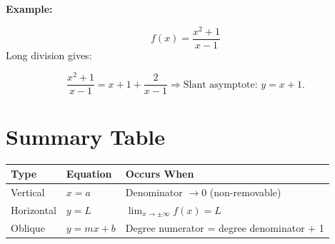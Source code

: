 \textbf{Example:}

\[
    f(x) = \frac{x^2 + 1}{x - 1}
\]
Long division gives:

\[
    \frac{x^2 + 1}{x - 1} = x + 1 + \frac{2}{x - 1}
    \Rightarrow \text{Slant asymptote: } y = x + 1.
\]

\section{Summary Table}

\begin{center}
    \begin{tabular}{|l|l|l|}
    \hline
    \textbf{Type} & \textbf{Equation} & \textbf{Occurs When} \\
    \hline
    Vertical      & \(x = a\)           & Denominator \(\to 0\) (non-removable) \\
    Horizontal    & \(y = L\)           & \(\lim_{x \to \pm \infty} f(x) = L\) \\
    Oblique       & \(y = mx + b\)      & Degree numerator = degree denominator + 1 \\
    \hline
    \end{tabular}
\end{center}